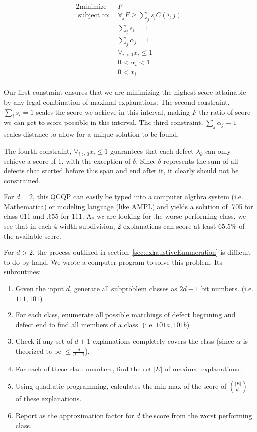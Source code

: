 \documentclass[11pt,twocolumn]{article}
\begin{document}
\begin{alignat*}{2}
  \text{minimize } & F \\
  \text{ subject to: } & \forall_j F \geq \sum_j s_j C(i,j) \\
                        & \sum_i s_i = 1 \\
                        & \sum_j \alpha_j = 1 \\
                        & \forall_{i>0} x_i \leq 1 \\
                        & 0 < \alpha_i < 1 \\
                        & 0 < x_i \\
\end{alignat*}

Our first constraint ensures that we are minimizing the highest score attainable by any legal combination of maximal explanations. The second constraint, $\sum_i s_i = 1$ scales the score we achieve in this interval, making $F$ the ratio of score we can get to score possible in this interval. The third constraint, $\sum_j \alpha_j = 1$ scales distance to allow for a unique solution to be found.  

The fourth constraint, $\forall_{i>0} x_i \leq 1$ guarantees that each defect $\lambda_k$ can only schieve a score of 1, with the exception of $\delta$. Since $\delta$ represents the sum of all defects that started before this span and end after it, it clearly should not be constrained.

For $d=2$, this QCQP can easily be typed into a computer algrbra system (i.e. Mathematica) or modeling language (like AMPL) and yields a solution of .705 for class $011$ and .655 for $111$.  As we are looking for the worse performing class, we see that in each 4 width subdivision, 2 explanations can score at least $65.5\%$ of the available score.

For $d > 2$, the process outlined in section~\ref{sec:exhaustiveEnumeration} is difficult to do by hand.  We wrote a computer program to solve this problem. Its subroutines:

\begin{enumerate}
\item Given the input $d$, generate all subproblem classes as $2d-1$ bit numbers.  (i.e. $111, 101$)
\item For each class, enumerate all possible matchings of defect beginning and defect end to find all members of a class. (i.e. $101a, 101b$)
\item Check if any set of $d+1$ explanations completely covers the class (since $\alpha$ is theorized to be $\leq \frac{d}{d+1}$).
\item For each of these class members, find the set $|E|$ of maximal explanations.  
\item Using quadratic programming, calculates the min-max of the score of $(^{|E|}_{\hspace{3pt}d})$ of these explanations.
\item Report as the approximation factor for $d$ the score from the worst performing class.
\end{enumerate}
\end{document}
